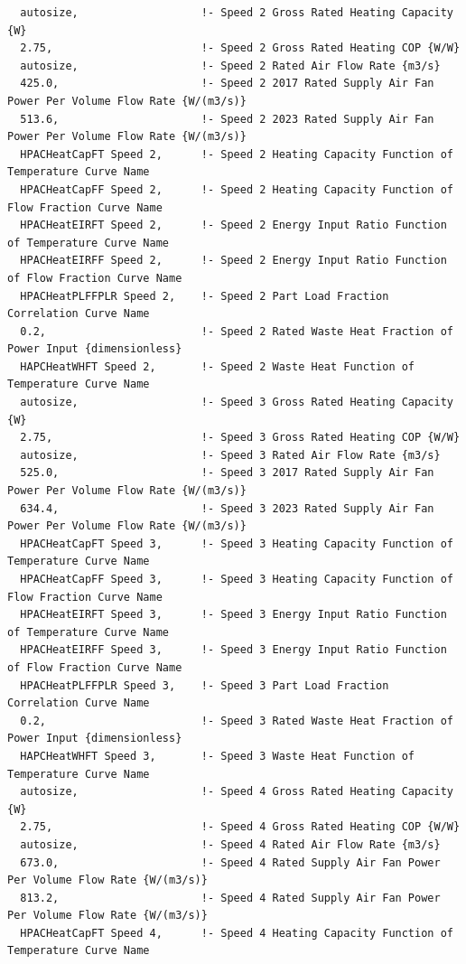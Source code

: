 \begin{lstlisting}
  autosize,                   !- Speed 2 Gross Rated Heating Capacity {W}
  2.75,                       !- Speed 2 Gross Rated Heating COP {W/W}
  autosize,                   !- Speed 2 Rated Air Flow Rate {m3/s}
  425.0,                      !- Speed 2 2017 Rated Supply Air Fan Power Per Volume Flow Rate {W/(m3/s)}
  513.6,                      !- Speed 2 2023 Rated Supply Air Fan Power Per Volume Flow Rate {W/(m3/s)}
  HPACHeatCapFT Speed 2,      !- Speed 2 Heating Capacity Function of Temperature Curve Name
  HPACHeatCapFF Speed 2,      !- Speed 2 Heating Capacity Function of Flow Fraction Curve Name
  HPACHeatEIRFT Speed 2,      !- Speed 2 Energy Input Ratio Function of Temperature Curve Name
  HPACHeatEIRFF Speed 2,      !- Speed 2 Energy Input Ratio Function of Flow Fraction Curve Name
  HPACHeatPLFFPLR Speed 2,    !- Speed 2 Part Load Fraction Correlation Curve Name
  0.2,                        !- Speed 2 Rated Waste Heat Fraction of Power Input {dimensionless}
  HAPCHeatWHFT Speed 2,       !- Speed 2 Waste Heat Function of Temperature Curve Name
  autosize,                   !- Speed 3 Gross Rated Heating Capacity {W}
  2.75,                       !- Speed 3 Gross Rated Heating COP {W/W}
  autosize,                   !- Speed 3 Rated Air Flow Rate {m3/s}
  525.0,                      !- Speed 3 2017 Rated Supply Air Fan Power Per Volume Flow Rate {W/(m3/s)}
  634.4,                      !- Speed 3 2023 Rated Supply Air Fan Power Per Volume Flow Rate {W/(m3/s)}
  HPACHeatCapFT Speed 3,      !- Speed 3 Heating Capacity Function of Temperature Curve Name
  HPACHeatCapFF Speed 3,      !- Speed 3 Heating Capacity Function of Flow Fraction Curve Name
  HPACHeatEIRFT Speed 3,      !- Speed 3 Energy Input Ratio Function of Temperature Curve Name
  HPACHeatEIRFF Speed 3,      !- Speed 3 Energy Input Ratio Function of Flow Fraction Curve Name
  HPACHeatPLFFPLR Speed 3,    !- Speed 3 Part Load Fraction Correlation Curve Name
  0.2,                        !- Speed 3 Rated Waste Heat Fraction of Power Input {dimensionless}
  HAPCHeatWHFT Speed 3,       !- Speed 3 Waste Heat Function of Temperature Curve Name
  autosize,                   !- Speed 4 Gross Rated Heating Capacity {W}
  2.75,                       !- Speed 4 Gross Rated Heating COP {W/W}
  autosize,                   !- Speed 4 Rated Air Flow Rate {m3/s}
  673.0,                      !- Speed 4 Rated Supply Air Fan Power Per Volume Flow Rate {W/(m3/s)}
  813.2,                      !- Speed 4 Rated Supply Air Fan Power Per Volume Flow Rate {W/(m3/s)}
  HPACHeatCapFT Speed 4,      !- Speed 4 Heating Capacity Function of Temperature Curve Name

\end{lstlisting}
